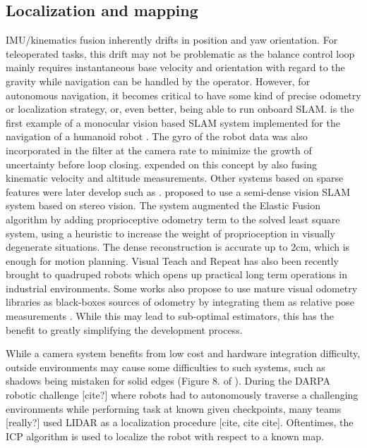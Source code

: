 \subsection{Localization and mapping}
IMU/kinematics fusion inherently drifts in position and yaw orientation. For teleoperated tasks, this drift may not be problematic as the balance control loop
mainly requires instantaneous base velocity and orientation with regard to the gravity while navigation can be handled by the operator. However, for autonomous
navigation, it becomes critical to have some kind of precise odometry or localization strategy, or, even better, being able to run onboard SLAM. 
\cite{davison2007monoslam} is the first example of a monocular vision based SLAM system implemented for the navigation of a humanoid robot . The gyro of the robot data
was also incorporated in the filter at the camera rate to minimize the growth of uncertainty before loop closing. \cite{stasse2006real} expended on this concept by also fusing
kinematic velocity and altitude measurements. Other systems based on sparse features were later develop such as \cite{ahn2012board, oriolo2012vision, oriolo2016humanoid, kwak20093d}.
\cite{scona2017direct} proposed to use a semi-dense vision SLAM system based on stereo vision. The system augmented the Elastic Fusion \cite{whelan2016elasticfusion} algorithm by adding 
proprioceptive odometry term to the solved least square system, using a heuristic to increase the weight of proprioception in visually degenerate situations. The 
dense reconstruction is accurate up to 2cm, which is enough for motion planning. Visual Teach and Repeat \cite{furgale2010visual} has also been recently brought to quadruped 
robots \cite{mattamala2021learning} which opens up practical long term operations in industrial environments. Some works also propose to use mature visual odometry libraries
as black-boxes sources of odometry by integrating them as relative pose measurements \cite{hartley2018legged,hartley2018hybrid}. While this may lead to sub-optimal estimators, 
this has the benefit to greatly simplifying the development process.

While a camera system benefits from low cost and hardware integration difficulty, outside environments 
may cause some difficulties to such systems, such as shadows being mistaken for solid edges (Figure 8. of \cite{fallon2014drift}).
During the DARPA robotic challenge [cite?] where robots had to autonomously traverse a challenging environments while performing task at known given checkpoints, 
many teams [really?] used LIDAR as a localization procedure [cite, cite cite]. Oftentimes, the ICP algorithm is used to localize the robot 
with respect to a known map.
 
